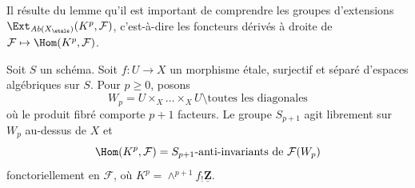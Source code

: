 \noindent
Il résulte du lemme qu'il est important de comprendre
les groupes d'extensions $\Ext_{\textit{Ab}(X_\etale)}(K^p, \mathcal{F})$,
c'est-à-dire les foncteurs dérivés à droite de
$\mathcal{F} \mapsto \Hom(K^p, \mathcal{F})$.

\begin{lemma}
\label{lemma-compute}
Soit $S$ un schéma. Soit $f : U \to X$ un morphisme étale, surjectif et séparé
d'espaces algébriques sur $S$. Pour $p \geq 0$, posons
$$
W_p = U \times_X \ldots \times_X U \setminus \text{toutes les diagonales}
$$
où le produit fibré comporte $p + 1$ facteurs.
Le groupe $S_{p + 1}$ agit librement sur $W_p$ au-dessus de $X$ et
$$
\Hom(K^p, \mathcal{F}) = S_{p + 1}\text{-anti-invariants de }
\mathcal{F}(W_p)
$$
fonctoriellement en $\mathcal{F}$, où
$K^p = \wedge^{p + 1}f_!\underline{\mathbf{Z}}$.
\end{lemma}

